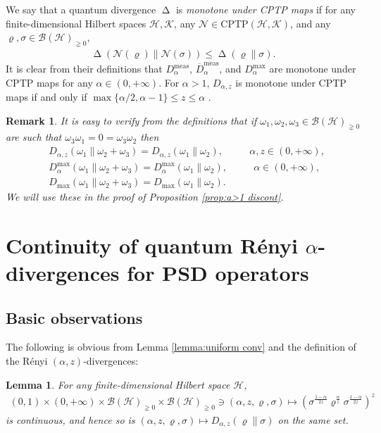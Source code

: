 \documentclass[unsortedaddress,superscriptaddress,pra,notitlepage]{revtex4}
\newtheorem{lemma}[definition]{Lemma}
\newtheorem{rem}[definition]{Remark}
\newcommand{\nn}{\nonumber \\}
\def\B{{\mathcal B}}
\def\N{\mathcal{N}}
\def\rho{\varrho}
\def\hil{{\mathcal H}}
\def\kil{{\mathcal K}}
\def\imp{\Longrightarrow}
\def\bz{\left(}
\def\jz{\right)}
\def\oll{\overline}
\def\nn{\nonumber}
\def\cptp{\mathrm{CPTP}}
\def\meas{\mathrm{meas}}
\def\pne{_{\gneq 0}}
\newcommand{\ki}[1]{\textit{\textit{#1}}}
\newcommand{\s}{\mbox{ }}
\newcommand{\ds}{\mbox{ }\mbox{ }}
\DeclareMathOperator{\divv}{\Delta}
\begin{document}
We say that a quantum divergence $\divv$ is \ki{monotone under CPTP maps} if for 
any finite-dimensional Hilbert spaces $\hil,\kil$, any 
$\N\in\cptp(\hil,\kil)$, and any
$\rho,\sigma\in\B(\hil)\pne$,
\begin{align*}
\divv(\N(\rho)\|\N(\sigma))\le\divv(\rho\|\sigma).
\end{align*}
It is clear from their definitions that $D_{\alpha}^{\meas}$, $\oll{D}_{\alpha}^{\meas}$,
and $D_{\alpha}^{\max}$
are monotone under CPTP maps for any $\alpha\in(0,+\infty)$. 
For $\alpha>1$, $D_{\alpha,z}$ is monotone under CPTP maps if and only if 
$\max\{\alpha/2,\alpha-1\}\le z\le \alpha$ \cite{Hiai_concavity2013,Zhang2018}.

\begin{rem}\label{rem:ort}
It is easy to verify from the definitions that if 
$\omega_1,\omega_2,\omega_3\in\B(\hil)\pne$ are such that 
$\omega_3\omega_1=0=\omega_3\omega_2$ then 
\begin{align}
&D_{\alpha,z}(\omega_1\|\omega_2+\omega_3)=
D_{\alpha,z}(\omega_1\|\omega_2),\ds\ds \alpha,z\in(0,+\infty),\label{ort1}\\
& D_{\alpha}^{\max}(\omega_1\|\omega_2+\omega_3)=
D_{\alpha}^{\max}(\omega_1\|\omega_2),\ds\ds \alpha\in(0,+\infty),\label{ort2}\\
& D_{\max}(\omega_1\|\omega_2+\omega_3)=
D_{\max}(\omega_1\|\omega_2).\label{ort3}
\end{align}
We will use these in the proof of Proposition \ref{prop:a>1 discont}.
\end{rem}


\section{Continuity of quantum R\'enyi $\alpha$-divergences for PSD operators}
\label{sec:PSD}

\subsection{Basic observations}
\label{sec:basic}

The following is obvious from Lemma \ref{lemma:uniform conv} and the definition
of the R\'enyi $(\alpha,z)$-divergences:
\begin{lemma}\label{lemma:0-1 cont}
For any finite-dimensional Hilbert space $\hil$,
\begin{align*}
(0,1)\times(0,+\infty)\times\B(\hil)\pne\times\B(\hil)\pne
\ni(\alpha,z,\rho,\sigma)\mapsto 
\bz\sigma^{\frac{1-\alpha}{2z}}\rho^{\frac{\alpha}{z}}
\sigma^{\frac{1-\alpha}{2z}}\jz^z
\end{align*}
is continuous, and hence so is 
$(\alpha,z,\rho,\sigma)\mapsto D_{\alpha,z}(\rho\|\sigma)$ on the same set.
\end{lemma}
\end{document}
